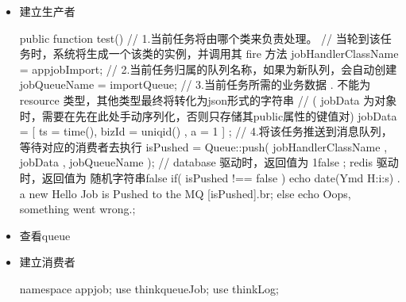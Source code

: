\documentclass[a4paper,10pt,english]{sphinxmanual}
\begin{document}
\begin{itemize}
\begin{itemize}
\item {} 
建立生产者

\begin{sphinxVerbatim}[commandchars=\\\{\}]
public function test()\PYGZob{}
    // 1.当前任务将由哪个类来负责处理。
    //   当轮到该任务时，系统将生成一个该类的实例，并调用其 fire 方法
    \PYGZdl{}jobHandlerClassName  = \PYGZsq{}app\PYGZbs{}job\PYGZbs{}Import\PYGZsq{};
    // 2.当前任务归属的队列名称，如果为新队列，会自动创建
    \PYGZdl{}jobQueueName     = \PYGZdq{}importQueue\PYGZdq{};
    // 3.当前任务所需的业务数据 . 不能为 resource 类型，其他类型最终将转化为json形式的字符串
    //   ( jobData 为对象时，需要在先在此处手动序列化，否则只存储其public属性的键值对)
    \PYGZdl{}jobData          = [ \PYGZsq{}ts\PYGZsq{} =\PYGZgt{} time(), \PYGZsq{}bizId\PYGZsq{} =\PYGZgt{} uniqid() , \PYGZsq{}a\PYGZsq{} =\PYGZgt{} 1 ] ;
    // 4.将该任务推送到消息队列，等待对应的消费者去执行
    \PYGZdl{}isPushed = Queue::push( \PYGZdl{}jobHandlerClassName , \PYGZdl{}jobData , \PYGZdl{}jobQueueName );
    // database 驱动时，返回值为 1\textbar{}false  ;   redis 驱动时，返回值为 随机字符串\textbar{}false
    if( \PYGZdl{}isPushed !== false )\PYGZob{}
        echo date(\PYGZsq{}Y\PYGZhy{}m\PYGZhy{}d H:i:s\PYGZsq{}) . \PYGZdq{} a new Hello Job is Pushed to the MQ [\PYGZdl{}isPushed]\PYGZdq{}.\PYGZdq{}\PYGZlt{}br\PYGZgt{}\PYGZdq{};
    \PYGZcb{}else\PYGZob{}
        echo \PYGZsq{}Oops, something went wrong.\PYGZsq{};
    \PYGZcb{}
\PYGZcb{}
\end{sphinxVerbatim}

\item {} 
查看queue

\begin{sphinxVerbatim}[commandchars=\\\{\}]
  
  
    
\end{sphinxVerbatim}

\item {} 
建立消费者

\begin{sphinxVerbatim}[commandchars=\\\{\}]
namespace app\PYGZbs{}job;
use think\PYGZbs{}queue\PYGZbs{}Job;
use think\PYGZbs{}Log;


\end{sphinxVerbatim}
\end{itemize}
\end{itemize}
\end{document}
